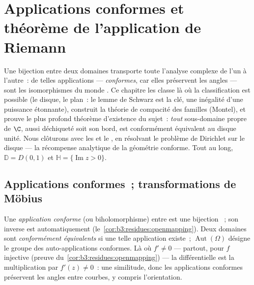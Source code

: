 \chapter{Applications conformes et théorème de l'application de Riemann}
\label{ch:b3:conformal}

Une bijection  entre deux domaines transporte toute
l'analyse complexe de l'un à l'autre~: de telles applications ---
\emph{conformes}, car elles préservent les angles --- sont les
isomorphismes du monde . Ce chapitre les classe là où
la classification est possible (le disque, le plan~: le lemme de
Schwarz est la clé, une inégalité d'une puissance étonnante),
construit la théorie de compacité des familles 
(Montel), et prouve le plus profond théorème d'existence du
sujet~: \emph{tout} sous-domaine propre  de
$\C$, aussi déchiqueté soit son bord, est conformément
équivalent au disque unité. Nous clôturons avec les  et le , en résolvant le problème de
Dirichlet sur le disque --- la récompense analytique de la
géométrie conforme. Tout au long, $\mathbb D = D(0,1)$ et
$\mathbb H = \{\operatorname{Im}z > 0\}$.

\section{Applications conformes~; transformations de Möbius}

\begin{definition}\label{def:b3:conformal:conformal}
Une \emph{application conforme} (ou
biholomorphisme) entre  est une bijection ~;
son inverse est automatiquement 
(le~\cref{cor:b3:residues:openmapping}). Deux domaines sont
\emph{conformément équivalents} si une telle application
existe~; $\operatorname{Aut}(\Omega)$ désigne le groupe des
auto-applications conformes. Là où $f' \neq 0$ --- partout,
pour $f$ injective (preuve
du~\cref{cor:b3:residues:openmapping}) --- la différentielle
est la multiplication par $f'(z) \neq 0$~: une similitude,
donc les applications conformes préservent les angles entre
courbes, y compris l'orientation.
\end{definition}

